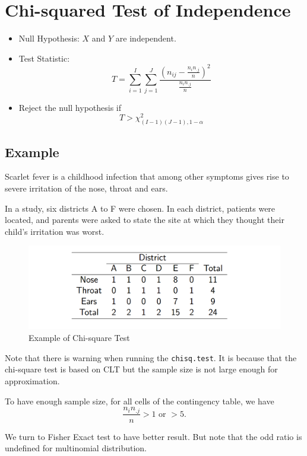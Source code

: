 \section{Chi-squared Test of Independence}
\begin{itemize}
	\item Null Hypothesis: $X$ and $Y$ are independent.
	\item Test Statistic:
	\[T = \sum_{i=1}^{I}\sum_{j=1}^{J} \frac{(n_{ij} - \frac{n_i n_{.j}}{n})^2}{\frac{n_i n_{.j}}{n}}\]
	\item Reject the null hypothesis if 
	\[T > \chi^2_{(I-1)(J-1), 1 - \alpha}\]
\end{itemize}

\subsection{Example}
Scarlet fever is a childhood infection that among other symptoms
gives rise to severe irritation of the nose, throat and ears. 

In a study, six districts A to F were chosen. In each district,
patients were located, and parents were asked to state the site
at which they thought their child's irritation was worst.

\begin{figure}[H]
	\centering
	\includegraphics[width=0.7\linewidth]{fig/screenshot003}
	\caption{Example of Chi-square Test}
	\label{fig:screenshot004}
\end{figure}




Note that there is warning when running the \texttt{chisq.test}. It is because that the chi-square test is based on CLT but the sample size is not large enough for approximation. 

To have enough sample size, for all cells of the contingency table, we have
\[\frac{n_i n_{.j}}{n} > 1 \text{ or } > 5.\]

We turn to Fisher Exact test to have better result. But note that the odd ratio is undefined for multinomial distribution.